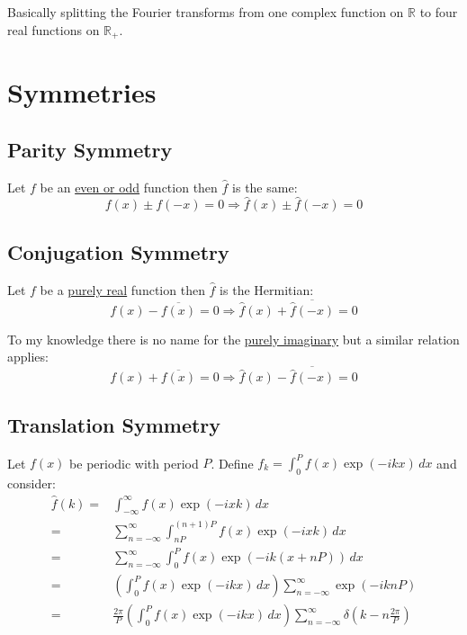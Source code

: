 \documentclass[12pt]{report}
\begin{document}
Basically splitting the Fourier transforms from one complex function on $\mathbb{R}$ to four real functions on $\mathbb{R}_+$.

\section{Symmetries}
\subsection{Parity Symmetry}
\label{sec:parity-sym}
Let $f$ be an \hyperref[appx:real-img-odd-even]{even or odd} function then $\hat{f}$ is the same:
\[f(x)\pm f(-x) = 0 \Rightarrow \hat{f}(x)\pm\hat{f}(-x) = 0\]

\subsection{Conjugation Symmetry}
\label{sec:conjugation-sym}
Let $f$ be a \hyperref[appx:real-img-odd-even]{purely real} function then $\hat{f}$ is the Hermitian:
\[f(x) - \overline{f(x)} = 0 \Rightarrow \hat{f}(x)+\overline{\hat{f}(-x)} = 0\]

To my knowledge there is no name for the \hyperref[appx:real-img-odd-even]{purely imaginary} but a similar relation applies:
\[f(x) + \overline{f(x)} = 0 \Rightarrow \hat{f}(x)-\overline{\hat{f}(-x)} = 0\]

\subsection{Translation Symmetry}
Let $f(x)$ be periodic with period $P$.
Define $f_k = \int_{0}^{P}f(x)\exp(-ikx)\,dx$ and consider:
\begin{equation*}
\begin{aligned}
	\hat{f}(k) =& \int_{-\infty}^{\infty}f(x)\exp(-ixk)\,dx \\
	=& \sum_{n=-\infty}^{\infty}\int_{nP}^{(n+1)P}f(x)\exp(-ixk)\,dx \\
	=& \sum_{n=-\infty}^{\infty}\int_{0}^{P}f(x)\exp(-ik(x+nP))\,dx \\
	=& \left(\int_{0}^{P}f(x)\exp(-ikx)\,dx\right)\sum_{n=-\infty}^{\infty}\exp(-iknP) \\
	=& \frac{2\pi}{P}\left(\int_{0}^{P}f(x)\exp(-ikx)\,dx\right)\sum_{n=-\infty}^{\infty}\delta\left(k-n\frac{2\pi}{P}\right)\\
\end{aligned}
\end{equation*}
\end{document}
